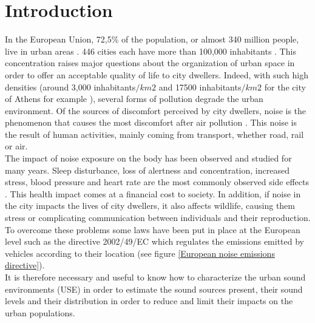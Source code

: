 \documentclass{article}
\begin{document}





\pagebreak
\tableofcontents
\pagebreak
{}


\section{Introduction}

\noindent In the European Union, 72,5\% of the population, or almost 340 million people, live in urban areas \cite{Pop_in_cities}. 446 cities each have more than 100,000 inhabitants \cite{Cities_with_more_than_100_habs}. This concentration raises major questions about the organization of urban space in order to offer an acceptable quality of life to city dwellers. Indeed, with such high densities (around 3,000 inhabitants$/km2$ and {\color{red} 17500 inhabitants$/km2$} for the city of Athens for example \cite{European_city_density}), several forms of pollution degrade the urban environment. Of the sources of discomfort perceived by city dwellers, noise is the phenomenon that causes the most discomfort after air pollution \cite{Noise_emissions_effects}. This noise is the result of human activities, mainly coming from transport, whether road, rail or air. \\
The impact of noise exposure on the body has been observed and studied for many years. Sleep disturbance, loss of alertness and concentration, increased stress, blood pressure and heart rate are the most commonly observed side effects \cite{Noise_emissions_effects}. This health impact comes at a financial cost to society. In addition, if noise in the city impacts the lives of city dwellers, it also affects wildlife, causing them stress or complicating communication between individuals and their reproduction. {\color{red} To overcome these problems some laws have been put in place at the European level such as the directive 2002/49/EC which regulates the emissions emitted by vehicles according to their location (see figure \ref{European noise emissions directive}).}\\
It is therefore necessary and useful to know how to characterize the urban sound environments (USE) in order to estimate the sound sources present, their sound levels and their distribution in order to reduce and limit their impacts on the urban populations. \\
\end{document}
